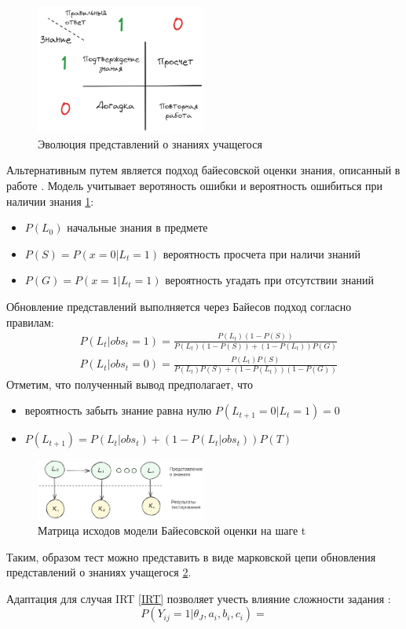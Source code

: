 \begin{figure}[h]
    \centering
    \includegraphics[width=0.5\textwidth]{assets/pedagogic/social/bkt.excalidraw.png}
    \caption{Эволюция представлений о знаниях учащегося}
    \label{bkt}
\end{figure}
Альтернативным путем является подход байесовской оценки знания,
описанный в работе \cite{corbett1994knowledge}.
Модель учитывает веротяность ошибки и вероятность ошибиться при наличии знания \ref{bkt}: \begin{itemize}
    \item $P(L_0)$ начальные знания в предмете
    \item $P(S) = P(x=0| L_t = 1)$ вероятность просчета при наличи знаний
    \item  $P(G) = P(x=1| L_t = 1)$ вероятность угадать при отсутствии знаний
\end{itemize}
Обновление представлений выполняется через Байесов подход согласно правилам:
\begin{equation}
    \begin{aligned}
        &P(L_t| obs_t=1) = \frac{P(L_t)(1-P(S))}{P(L_t)(1-P(S)) + (1-P(L_t))P(G)} \\
        &P(L_t| obs_t=0) = \frac{P(L_t)P(S)}{P(L_t) P(S) + (1-P(L_t))(1-P(G))}
    \end{aligned}
\end{equation}
Отметим, что полученный вывод предполагает, что \begin{itemize}
    \item вероятность забыть знание равна нулю $ P(L_{t+1}=0|L_t=1)=0$
    \item $P(L_{t+1}) = P(L_t|obs_t) + \left(1 - P(L_t | obs_t)\right) P(T)$
\end{itemize}
\begin{figure}[h]
    \centering
    \includegraphics[width=0.5\textwidth]{assets/pedagogic/social/bkt_automata.excalidraw.png}
    \caption{Матрица исходов модели Байесовской оценки на шаге t}
    \label{bkt_automata}
\end{figure}
Таким, образом тест можно представить в виде марковской цепи обновления представлений о знаниях учащегося \ref{bkt_automata}.

Адаптация для случая IRT \ref{IRT} позволяет учесть влияние сложности задания \cite{bulut2023introduction}:
\begin{equation}
    P(Y_{ij}=1| \theta_J, a_i,b_i,c_i) =
\end{equation}



